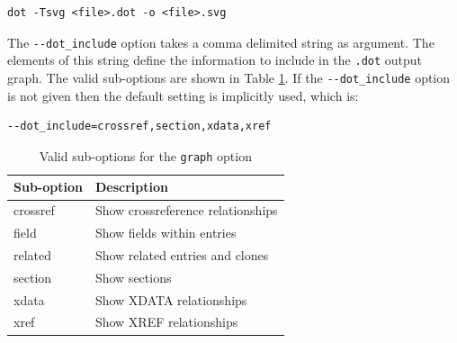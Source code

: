 \documentclass{ltxdockit}
\begin{document}
\begin{verbatim}
dot -Tsvg <file>.dot -o <file>.svg
\end{verbatim}

\noindent The \verb+--dot_include+ option takes a comma delimited string as
argument. The elements of this string define the information to include in
the \verb+.dot+ output graph. The valid sub-options are shown in Table
\ref{tab:graphopts}. If the \verb+--dot_include+ option is not given
then the default setting is implicitly used, which is:

\begin{verbatim}
--dot_include=crossref,section,xdata,xref
\end{verbatim}

\begin{table}
\begin{center}
\small
\begin{tabular}{ll}
\toprule
Sub-option & Description\\
\midrule
crossref & Show crossreference relationships\\
field    & Show fields within entries\\
related  & Show related entries and clones\\
section  & Show sections\\
xdata    & Show XDATA relationships\\
xref     & Show XREF relationships\\
\bottomrule
\end{tabular}
\end{center}
\caption{Valid sub-options for the \texttt{graph} option}
\label{tab:graphopts}
\end{table}
\end{document}
